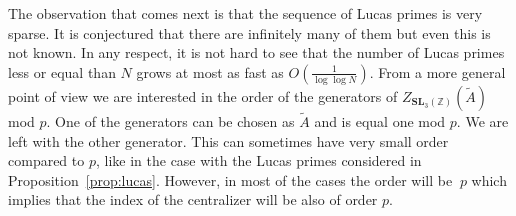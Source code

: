 \documentclass[a4paper]{article}
\newcommand{\SL}{\mathbf{SL}_3(\mathbb{Z})}        %
\begin{document}
The observation that comes next is that the sequence of Lucas primes is very sparse. It is conjectured that there are infinitely many of them but even this is not known. In any respect, it is not hard to see that the number of Lucas primes less or equal than $N$ grows at most as fast as $O(\frac{1}{\log\log N})$. From a more general point of view we are interested in the order of the generators of $Z_{\SL}(\tilde A)$ mod $p$. One of the generators can be chosen as $\tilde{A}$ and is equal one mod $p$. We are left with the other generator.  This can sometimes have very small order compared to $p$, like in the case with the Lucas primes considered in Proposition~\ref{prop:lucas}. However, in most of the cases the order will be $~p$ which implies that the index of the centralizer will be also of order $p$. 



\end{document}

